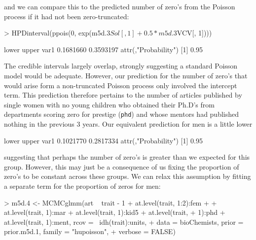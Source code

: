\documentclass{article}
\begin{document}
and we can compare this to the predicted number of zero's from the Poisson process if it had not been zero-truncated:

\begin{Schunk}
\begin{Sinput}
> HPDinterval(ppois(0, exp(m5d.3$Sol[, 1] + 0.5 * m5d.3$VCV[, 1])))
\end{Sinput}
\begin{Soutput}
         lower     upper
var1 0.1681660 0.3593197
attr(,"Probability")
[1] 0.95
\end{Soutput}
\end{Schunk}

The credible intervals largely overlap, strongly suggesting a standard Poisson model would be adequate. However, our prediction for the number of zero's that would arise form a non-truncated Poisson process only involved the intercept term. This prediction therefore pertains to the number of articles published by single women with no young children who obtained their Ph.D's from departments scoring zero for prestige (\texttt{phd}) and whose mentors had published nothing in the previous 3 years.  Our equivalent prediction for men is a little lower 

\begin{Schunk}
\begin{Soutput}
         lower     upper
var1 0.1021770 0.2817334
attr(,"Probability")
[1] 0.95
\end{Soutput}
\end{Schunk}

suggesting that perhaps the number of zero's is greater than we expected for this group. However, this may just be a consequence of us fixing the proportion of zero's to be constant across these groups. We can relax this assumption by fitting a separate term for the proportion of zeros for men:

\begin{Schunk}
\begin{Sinput}
> m5d.4 <- MCMCglmm(art ~ trait - 1 + at.level(trait, 1:2):fem + 
+     at.level(trait, 1):mar + at.level(trait, 1):kid5 + at.level(trait, 
+     1):phd + at.level(trait, 1):ment, rcov = ~idh(trait):units, 
+     data = bioChemists, prior = prior.m5d.1, family = "hupoisson", 
+     verbose = FALSE)
\end{Sinput}
\end{Schunk}
\end{document}
